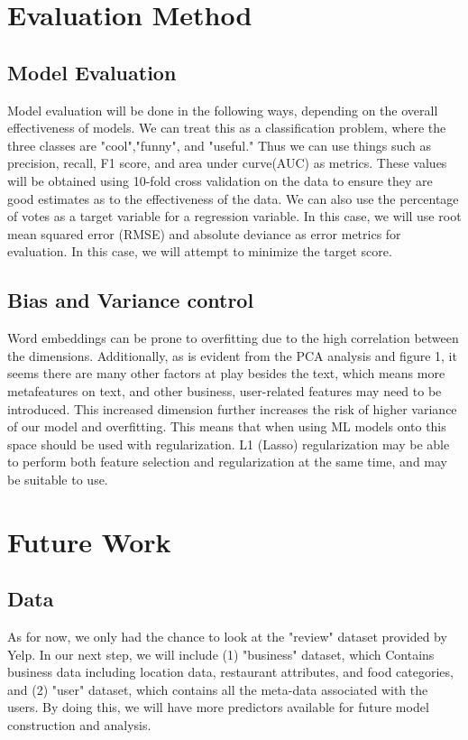 \documentclass{article}
\begin{document}
\section{Evaluation Method}
\subsection{Model Evaluation}
Model evaluation will be done in the following ways, depending on the overall effectiveness of models. We can treat this as a classification problem, where the three classes are "cool","funny", and "useful." Thus we can use things such as precision, recall, F1 score, and area under curve(AUC) as metrics. These values will be obtained using 10-fold cross validation on the data to ensure they are good estimates as to the effectiveness of the data. We can also use the percentage of votes as a target variable for a regression variable. In this case, we will use root mean squared error (RMSE) and absolute deviance as error metrics for evaluation. In this case, we will attempt to minimize the target score.
\subsection{Bias and Variance control}
Word embeddings can be prone to overfitting due to the high correlation between the dimensions. Additionally, as is evident from the PCA analysis and figure 1, it seems there are many other factors at play besides the text, which means more metafeatures on text, and other business, user-related features may need to be introduced. This increased dimension further increases the risk of higher variance of our model and overfitting. This means that when using ML models onto this space should be used with regularization. L1 (Lasso) regularization may be able to perform both feature selection and regularization at the same time, and may be suitable to use. 

\section{Future Work}
\subsection{Data}
As for now, we only had the chance to look at the "review" dataset provided by Yelp. In our next step, we will include (1) "business" dataset, which Contains business data including location data, restaurant attributes, and food categories, and (2) "user" dataset, which contains all the meta-data associated with the users. By doing this, we will have more predictors available for future model construction and analysis.
\end{document}
